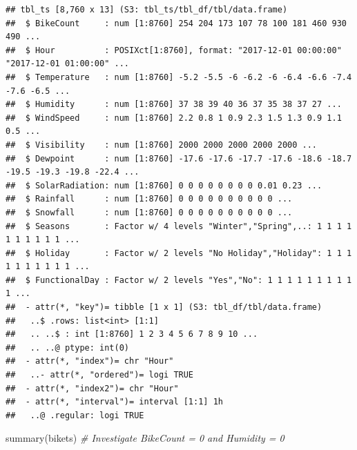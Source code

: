 \documentclass[
]{article}
\newenvironment{Shaded}{\begin{snugshade}}{\end{snugshade}}
\newcommand{\CommentTok}[1]{\textcolor[rgb]{0.56,0.35,0.01}{\textit{#1}}}
\newcommand{\FunctionTok}[1]{\textcolor[rgb]{0.00,0.00,0.00}{#1}}
\newcommand{\NormalTok}[1]{#1}
\begin{document}
\begin{verbatim}
## tbl_ts [8,760 x 13] (S3: tbl_ts/tbl_df/tbl/data.frame)
##  $ BikeCount     : num [1:8760] 254 204 173 107 78 100 181 460 930 490 ...
##  $ Hour          : POSIXct[1:8760], format: "2017-12-01 00:00:00" "2017-12-01 01:00:00" ...
##  $ Temperature   : num [1:8760] -5.2 -5.5 -6 -6.2 -6 -6.4 -6.6 -7.4 -7.6 -6.5 ...
##  $ Humidity      : num [1:8760] 37 38 39 40 36 37 35 38 37 27 ...
##  $ WindSpeed     : num [1:8760] 2.2 0.8 1 0.9 2.3 1.5 1.3 0.9 1.1 0.5 ...
##  $ Visibility    : num [1:8760] 2000 2000 2000 2000 2000 ...
##  $ Dewpoint      : num [1:8760] -17.6 -17.6 -17.7 -17.6 -18.6 -18.7 -19.5 -19.3 -19.8 -22.4 ...
##  $ SolarRadiation: num [1:8760] 0 0 0 0 0 0 0 0 0.01 0.23 ...
##  $ Rainfall      : num [1:8760] 0 0 0 0 0 0 0 0 0 0 ...
##  $ Snowfall      : num [1:8760] 0 0 0 0 0 0 0 0 0 0 ...
##  $ Seasons       : Factor w/ 4 levels "Winter","Spring",..: 1 1 1 1 1 1 1 1 1 1 ...
##  $ Holiday       : Factor w/ 2 levels "No Holiday","Holiday": 1 1 1 1 1 1 1 1 1 1 ...
##  $ FunctionalDay : Factor w/ 2 levels "Yes","No": 1 1 1 1 1 1 1 1 1 1 ...
##  - attr(*, "key")= tibble [1 x 1] (S3: tbl_df/tbl/data.frame)
##   ..$ .rows: list<int> [1:1] 
##   .. ..$ : int [1:8760] 1 2 3 4 5 6 7 8 9 10 ...
##   .. ..@ ptype: int(0) 
##  - attr(*, "index")= chr "Hour"
##   ..- attr(*, "ordered")= logi TRUE
##  - attr(*, "index2")= chr "Hour"
##  - attr(*, "interval")= interval [1:1] 1h
##   ..@ .regular: logi TRUE
\end{verbatim}

\begin{Shaded}
\begin{Highlighting}[]
\FunctionTok{summary}\NormalTok{(bikets) }\CommentTok{\# Investigate BikeCount = 0 and Humidity = 0}
\end{Highlighting}
\end{Shaded}
\end{document}
